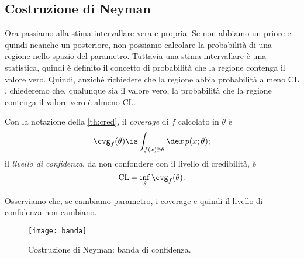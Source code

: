 
\subsection{Costruzione di Neyman}

Ora passiamo alla stima intervallare vera e propria.
Se non abbiamo un priore e quindi neanche un posteriore,
non possiamo calcolare la probabilità di una regione nello spazio del parametro.
Tuttavia una stima intervallare è una statistica,
quindi è definito il concetto di probabilità che la regione contenga il valore vero.
Quindi, anziché richiedere che la regione abbia probabilità almeno $\mathrm{CL}$,
chiederemo che,
qualunque sia il valore vero,
la probabilità che la regione contenga il valore vero è almeno $\mathrm{CL}$.

\begin{definition}[Coverage]
	Con la notazione della \autoref{th:cred},
	il \emph{coverage} di $f$ calcolato in $\theta$ è
	\begin{equation*}
		\cvg_f(\theta)
		\is \int_{f(x)\ni\theta} \de x\, p(x;\theta);
	\end{equation*}
	il \emph{livello di confidenza}, da non confondere con il livello di credibilità, è
	\begin{equation*}
		\mathrm{CL}
		= \inf_\theta \cvg_f(\theta).
	\end{equation*}
\end{definition}

Osserviamo che,
se cambiamo parametro,
i coverage e quindi il livello di confidenza non cambiano.

\begin{figure}
	\centering
	\texttt{[image: banda]}
	\caption{\label{fig:neyman}%
	Costruzione di Neyman: banda di confidenza.}
\end{figure}


